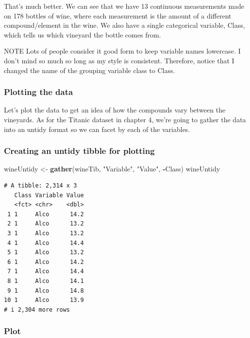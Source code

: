 \documentclass[
]{article}
\newenvironment{Shaded}{\begin{snugshade}}{\end{snugshade}}
\newcommand{\FunctionTok}[1]{\textcolor[rgb]{0.13,0.29,0.53}{\textbf{#1}}}
\newcommand{\NormalTok}[1]{#1}
\newcommand{\OtherTok}[1]{\textcolor[rgb]{0.56,0.35,0.01}{#1}}
\newcommand{\SpecialCharTok}[1]{\textcolor[rgb]{0.81,0.36,0.00}{\textbf{#1}}}
\newcommand{\StringTok}[1]{\textcolor[rgb]{0.31,0.60,0.02}{#1}}
\begin{document}
That's much better. We can see that we have 13 continuous measurements
made on 178 bottles of wine, where each measurement is the amount of a
different compound/element in the wine. We also have a single
categorical variable, Class, which tells us which vineyard the bottle
comes from.

NOTE Lots of people consider it good form to keep variable names
lowercase. I don't mind so much so long as my style is consistent.
Therefore, notice that I changed the name of the grouping variable class
to Class.

\subsubsection{Plotting the data}\label{plotting-the-data-1}

Let's plot the data to get an idea of how the compounds vary between the
vineyards. As for the Titanic dataset in chapter 4, we're going to
gather the data into an untidy format so we can facet by each of the
variables.

\subsubsection{Creating an untidy tibble for
plotting}\label{creating-an-untidy-tibble-for-plotting-1}

\begin{Shaded}
\begin{Highlighting}[]
\NormalTok{wineUntidy }\OtherTok{\textless{}{-}} \FunctionTok{gather}\NormalTok{(wineTib, }\StringTok{"Variable"}\NormalTok{, }\StringTok{"Value"}\NormalTok{, }\SpecialCharTok{{-}}\NormalTok{Class)}
\NormalTok{wineUntidy}
\end{Highlighting}
\end{Shaded}

\begin{verbatim}
# A tibble: 2,314 x 3
   Class Variable Value
   <fct> <chr>    <dbl>
 1 1     Alco      14.2
 2 1     Alco      13.2
 3 1     Alco      13.2
 4 1     Alco      14.4
 5 1     Alco      13.2
 6 1     Alco      14.2
 7 1     Alco      14.4
 8 1     Alco      14.1
 9 1     Alco      14.8
10 1     Alco      13.9
# i 2,304 more rows
\end{verbatim}

\subsubsection{Plot}\label{plot}
\end{document}
